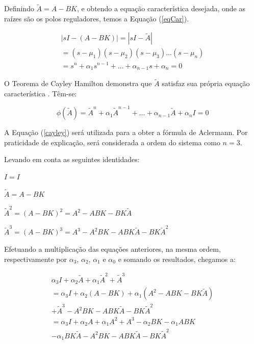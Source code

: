 \documentclass[journal,brazil,english]{IEEEtran}
\begin{document}
Definindo $\tilde{A}=A-BK$, e obtendo a equação característica desejada, onde as raízes são os polos reguladores, temos a Equação (\ref{eqCar}).

\begin{equation}\label{eqCar}
\begin{matrix}
|sI-(A-BK)| = |sI-\tilde{A}| \\= (s-\mu _1)(s-\mu _2)(s-\mu _3)\ldots(s-\mu _n) \\= s^n + \alpha _1 s^{n-1} + \ldots + \alpha _{n-1}s +\alpha _n=0
\end{matrix}
\end{equation}

O Teorema de Cayley Hamilton demonstra que $\tilde{A}$ satisfaz sua própria equação característica \cite{ogata}. Têm-se:

\begin{equation}\label{cayley}
\phi(\tilde{A}) = \tilde{A}^n + \alpha _1 \tilde{A}^{n-1} + \ldots + \alpha _{n-1}\tilde{A} +\alpha _nI=0
\end{equation}

A Equação (\ref{cayley}) será utilizada para a obter a fórmula de Aclermann. Por praticidade de explicação, será considerada a ordem do sistema como $n=3$.

Levando em conta as seguintes identidades:

$I=I$

$\tilde{A} = A-BK$

$\tilde{A}^2 = (A-BK)^2 = A^2-ABK -BK\tilde{A}$

$\tilde{A}^3 = (A-BK)^3 = A^3 - A^2BK -ABK\tilde{A} -BK\tilde{A}^2$

Efetuando a multiplicação das equações anteriores, na mesma ordem, respectivamente por $\alpha _3$, $\alpha _2$, $\alpha _1$ e $\alpha _0$ e somando os resultados, chegamos a:

\begin{equation}\label{multiplicaalfa}
\begin{matrix}
\alpha _3I + \alpha _2 \tilde{A} + \alpha _1 \tilde{A}^2 + \tilde{A}^3\\
= \alpha _3I + \alpha _2 (A-BK) + \alpha _1 (A^2-ABK-BK\tilde{A})\\
+ \tilde{A}^3-A^2BK-ABK\tilde{A}-BK\tilde{A}^2\\
= \alpha _3I + \alpha _2 A + \alpha _1 A^2 + A^3 - \alpha _2BK - \alpha _1ABK \\
- \alpha _1BK\tilde{A} - A^2BK - ABK\tilde{A} - BK\tilde{A}^2\\
\end{matrix}
\end{equation}
\end{document}
